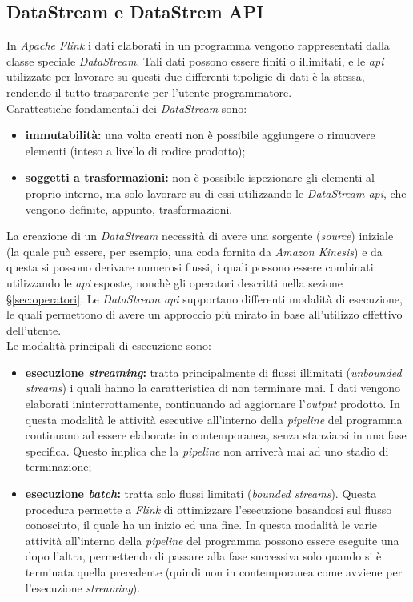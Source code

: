 \subsection{DataStream e DataStrem API}
In \textit{Apache Flink} i dati elaborati in un programma vengono rappresentati dalla classe speciale \textit{DataStream}.
Tali dati possono essere finiti o illimitati, e le \textit{\gls{api}} utilizzate per lavorare su questi due differenti tipoligie di dati è la stessa, rendendo il tutto trasparente per l'utente programmatore.\\
Carattestiche fondamentali dei \textit{DataStream} sono:
\begin{itemize}
	\item{\textbf{immutabilità:} una volta creati non è possibile aggiungere o rimuovere elementi (inteso a livello di codice prodotto);}
	\item{\textbf{soggetti a trasformazioni:} non è possibile ispezionare gli elementi al proprio interno, ma solo lavorare su di essi utilizzando le \textit{DataStream \textit{\gls{api}}}, che vengono definite, appunto, trasformazioni.}
\end{itemize}
La creazione di un \textit{DataStream} necessità di avere una sorgente (\textit{source}) iniziale (la quale può essere, per esempio, una coda fornita da \textit{\gls{Amazon Kinesis}}) e da questa si possono derivare numerosi flussi, i quali possono essere combinati utilizzando le \textit{\gls{api}} esposte, nonchè gli operatori descritti nella sezione \S\ref{sec:operatori}.
Le \textit{DataStream \textit{\gls{api}}} supportano differenti modalità di esecuzione, le quali permettono di avere un approccio più mirato in base all'utilizzo effettivo dell'utente.\\
Le modalità principali di esecuzione sono:
\begin{itemize}
	\item{\textbf{esecuzione \textit{streaming}:} tratta principalmente di flussi illimitati (\textit{\gls{unbounded streams}}) i quali hanno la caratteristica di non terminare mai. I dati vengono elaborati ininterrottamente, continuando ad aggiornare l'\textit{output} prodotto. In questa modalità le attività esecutive all'interno della \textit{\gls{pipeline}} del programma continuano ad essere elaborate in contemporanea, senza stanziarsi in una fase specifica. Questo implica che la \textit{\gls{pipeline}} non arriverà mai ad uno stadio di terminazione;}
	\item{\textbf{esecuzione \textit{batch}:} tratta solo flussi limitati (\textit{\gls{bounded streams}}). Questa procedura permette a \textit{Flink} di ottimizzare l'esecuzione basandosi sul flusso conosciuto, il quale ha un inizio ed una fine. In questa modalità le varie attività all'interno della \textit{\gls{pipeline}} del programma possono essere eseguite una dopo l'altra, permettendo di passare alla fase successiva solo quando si è terminata quella precedente (quindi non in contemporanea come avviene per l'esecuzione \textit{streaming})}.
\end{itemize}


